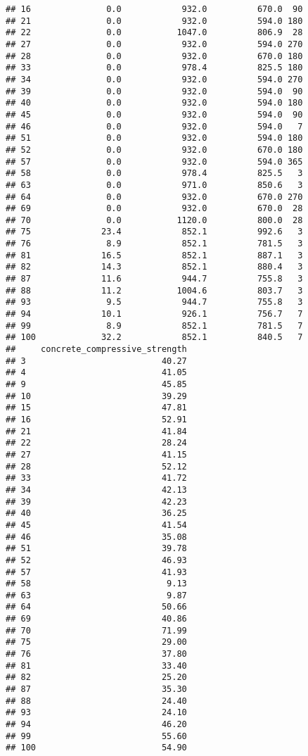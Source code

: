 \documentclass[]{article}
\begin{document}
\begin{verbatim}
## 16               0.0            932.0          670.0  90
## 21               0.0            932.0          594.0 180
## 22               0.0           1047.0          806.9  28
## 27               0.0            932.0          594.0 270
## 28               0.0            932.0          670.0 180
## 33               0.0            978.4          825.5 180
## 34               0.0            932.0          594.0 270
## 39               0.0            932.0          594.0  90
## 40               0.0            932.0          594.0 180
## 45               0.0            932.0          594.0  90
## 46               0.0            932.0          594.0   7
## 51               0.0            932.0          594.0 180
## 52               0.0            932.0          670.0 180
## 57               0.0            932.0          594.0 365
## 58               0.0            978.4          825.5   3
## 63               0.0            971.0          850.6   3
## 64               0.0            932.0          670.0 270
## 69               0.0            932.0          670.0  28
## 70               0.0           1120.0          800.0  28
## 75              23.4            852.1          992.6   3
## 76               8.9            852.1          781.5   3
## 81              16.5            852.1          887.1   3
## 82              14.3            852.1          880.4   3
## 87              11.6            944.7          755.8   3
## 88              11.2           1004.6          803.7   3
## 93               9.5            944.7          755.8   3
## 94              10.1            926.1          756.7   7
## 99               8.9            852.1          781.5   7
## 100             32.2            852.1          840.5   7
##     concrete_compressive_strength
## 3                           40.27
## 4                           41.05
## 9                           45.85
## 10                          39.29
## 15                          47.81
## 16                          52.91
## 21                          41.84
## 22                          28.24
## 27                          41.15
## 28                          52.12
## 33                          41.72
## 34                          42.13
## 39                          42.23
## 40                          36.25
## 45                          41.54
## 46                          35.08
## 51                          39.78
## 52                          46.93
## 57                          41.93
## 58                           9.13
## 63                           9.87
## 64                          50.66
## 69                          40.86
## 70                          71.99
## 75                          29.00
## 76                          37.80
## 81                          33.40
## 82                          25.20
## 87                          35.30
## 88                          24.40
## 93                          24.10
## 94                          46.20
## 99                          55.60
## 100                         54.90
\end{verbatim}
\end{document}
